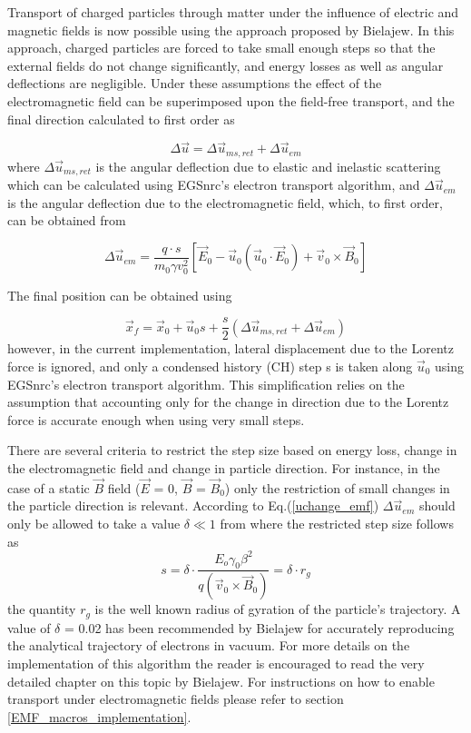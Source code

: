 Transport of charged particles through matter under the influence of electric and magnetic fields is now possible
using the approach proposed by Bielajew\cite{Bi89a}. In this approach, charged particles are forced
to take small enough steps so that the external fields do not change significantly, and energy losses as well
as angular deflections are negligible. Under these assumptions the effect of the electromagnetic field can
be superimposed upon the field-free transport, and the final direction calculated to first order as

\begin{equation}
\Delta\vec{u} = \Delta\vec{u}_{ms,ret} + \Delta\vec{u}_{em}
\end{equation}
where $\Delta\vec{u}_{ms,ret}$ is the angular deflection due to elastic and inelastic scattering which
can be calculated using EGSnrc's electron transport algorithm, and $\Delta\vec{u}_{em}$ is the angular
deflection due to the electromagnetic field, which, to first order, can be obtained from

\begin{equation}
\label{uchange_emf}
    \Delta\vec{u}_{em} = \frac{q \cdot s}{m_0 \gamma v^2_0} \left[\vec{E}_0 - \vec{u}_0(\vec{u}_0\cdot \vec{E}_0) + \vec{v}_0 \times \vec{B}_0\right]
\end{equation}


The final position can be obtained using

\begin{equation}
    \vec{x}_f = \vec{x}_0 + \vec{u}_0 s + \frac{s}{2} \left(\Delta\vec{u}_{ms,ret} + \Delta\vec{u}_{em}\right)
\end{equation}
however, in the current implementation, lateral displacement due to the Lorentz force is ignored, and only a condensed history (CH) step s is taken along $\vec{u}_0$ using EGSnrc's electron transport algorithm. This simplification relies on the assumption that accounting only for the change in direction due to the Lorentz force is accurate enough when using very small steps.

There are several criteria to restrict the step size based on energy loss, change in the electromagnetic field and change in particle direction. For instance, in the case of a static $\vec{B}$ field ($\vec{E}$ = 0, $\vec{B}$ = $\vec{B}_0$) only the restriction of small changes in the particle direction is relevant. According to Eq.(\ref{uchange_emf}) $\Delta\vec{u}_{em}$ should only be allowed to take a value $\delta \ll 1$ from where the restricted step size follows as
\begin{equation}
\label{uchange_restriction}
  s = \delta \cdot \frac{E_o \gamma_0 \beta^2}{q\left(\vec{v}_0 \times \vec{B}_0\right)} = \delta \cdot r_g
\end{equation}
the quantity $r_g$ is the well known radius of gyration of the particle's trajectory. A value of $\delta$ = 0.02 has been recommended by Bielajew for accurately reproducing the analytical trajectory of electrons in vacuum. For more details on the implementation of this algorithm the reader is encouraged to read the very detailed chapter on this topic by Bielajew\cite{Bi89a}. For instructions on how to enable transport under electromagnetic fields please refer to section \ref{EMF_macros_implementation}.

\newpage
